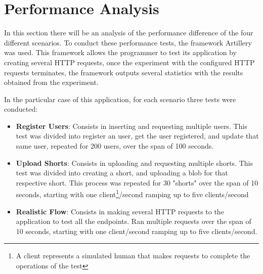 \documentclass[10pt,a4paper,twocolumn]{article}
\begin{document}
\section{Performance Analysis}
\label{sec:Perf}
In this section there will be an analysis of the performance difference of the four different scenarios. To conduct these performance tests, the framework Artillery\cite{artillery} was used. This framework allows the programmer to test its application by creating several HTTP requests, once the experiment with the configured HTTP requests terminates, the framework outputs several statistics with the results obtained from the experiment.
\par In the particular case of this application, for each scenario three tests were conducted:
\begin{itemize}
  \item \textbf{Register Users}: Consists in inserting and requesting multiple users. This test was divided into register an user, get the user registered, and update that same user, repeated for 200 users, over the span of 100 seconds. 
  \item \textbf{Upload Shorts}: Consists in uploading and requesting multiple shorts. This test was divided into creating a short, and uploading a blob for that respective short. This process was repeated for 30 "shorts" over the span of 10 seconds, starting with one client\footnote{A client represents a simulated human that makes requests to complete the operations of the test}/second ramping up to five clients/second
  \item \textbf{Realistic Flow}: Consists in making several HTTP requests to the application to test all the endpoints. Ran multiple requests over the span of 10 seconds, starting with one client/second ramping up to five clients/second.
\end{itemize}
  
\end{document}
